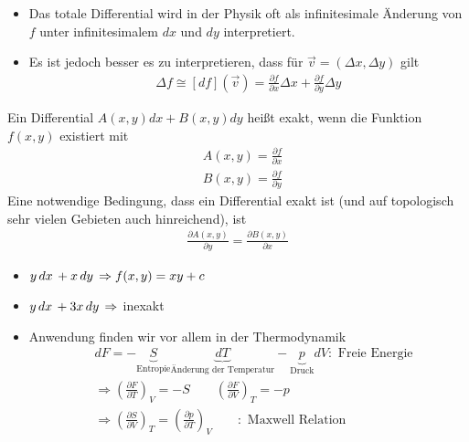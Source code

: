 \begin{Bemerkung}
\par
\begin{itemize}
  \item Das totale Differential wird in der Physik oft als infinitesimale Änderung von $f$ unter infinitesimalem $dx$ und $dy$ interpretiert.
  \item Es ist jedoch besser es zu interpretieren, dass für $\vec v = (\Delta x, \Delta y)$ gilt
  \begin{align*}
\Delta f \cong [df](\vec v) = \frac{\partial f}{\partial x}\Delta x +
\frac{\partial f}{\partial y}\Delta y
\end{align*}
\end{itemize}
\end{Bemerkung}
Ein Differential $A(x,y)dx+B(x,y)dy$ heißt exakt, wenn die Funktion $f(x,y)$ existiert mit
\begin{align*}
&A(x,y) = \frac{\partial f}{\partial x}\\
&B(x,y) = \frac{\partial f}{\partial y}
\end{align*}
Eine notwendige Bedingung, dass ein Differential exakt ist (und auf
topologisch sehr vielen Gebieten auch hinreichend), ist
\begin{align}
\frac{\partial A(x,y)}{\partial y} = \frac{\partial B(x,y)}{\partial x}
\end{align}
\begin{Beispiel}
\begin{itemize}
  \item $y\,dx\, + x\,dy\, \Rightarrow f(x,y) = xy+c$
  \item $y\,dx\, + 3x\,dy\, \Rightarrow$ inexakt
  \item Anwendung finden wir vor allem in der Thermodynamik
  \begin{align*}
&dF = - \underbrace{S}_{\text{Entropie}}\underbrace{dT}_{\text{Änderung der Temperatur}} - \underbrace{p}_{\text{Druck}}dV : \text{ Freie Energie}\\
&\Rightarrow \left(\frac{\partial F}{\partial T} \right)_V = -S \qquad \left(\frac{\partial F}{\partial V} \right)_T = -p\\
&\Rightarrow \left(\frac{\partial S}{\partial V} \right)_T =
\left(\frac{\partial p}{\partial T} \right)_V \qquad :\text{ Maxwell Relation}\\
\end{align*}
\end{itemize}
\end{Beispiel}

